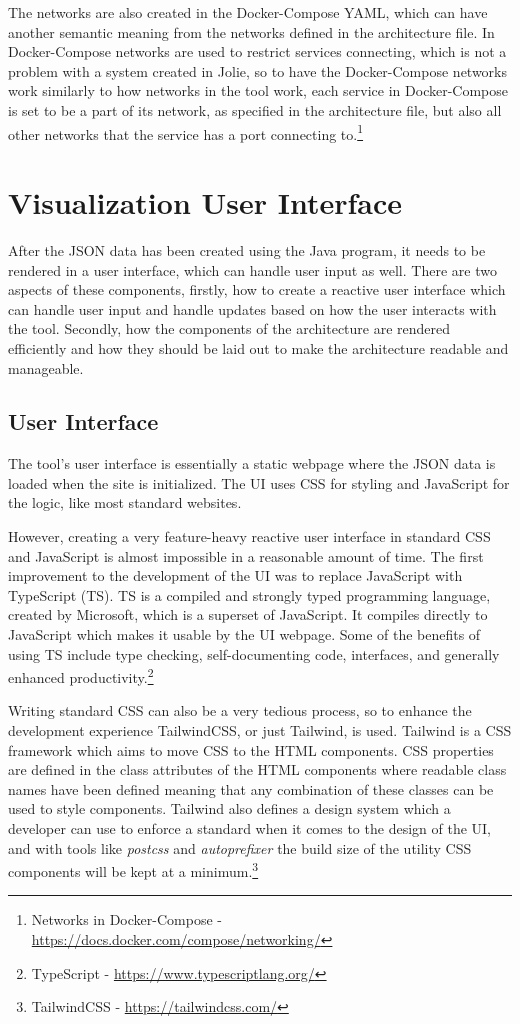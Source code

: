 The networks are also created in the Docker-Compose YAML, which can have another semantic meaning from the networks defined in the architecture file.
In Docker-Compose networks are used to restrict services connecting, which is not a problem with a system created in Jolie, so to have the Docker-Compose networks work similarly to how networks in the tool work, each service in Docker-Compose is set to be a part of
its network, as specified in the architecture file, but also all other networks that the service has a port connecting to.\footnote{Networks in Docker-Compose - \url{https://docs.docker.com/compose/networking/}}

\section{Visualization User Interface}
After the JSON data has been created using the Java program, it needs to be rendered in a user interface, which can handle user input as well.
There are two aspects of these components, firstly, how to create a reactive user interface which can handle user input and handle updates based on how the user interacts with the tool. Secondly, how the components of the architecture are rendered efficiently and how they should be laid out to make the architecture readable and manageable.

\subsection{User Interface}
The tool's user interface is essentially a static webpage where the JSON data is loaded when the site is initialized.
The UI uses CSS for styling and JavaScript for the logic, like most standard websites.

However, creating a very feature-heavy reactive user interface in standard CSS and JavaScript is almost impossible in a reasonable amount of time.
The first improvement to the development of the UI was to replace JavaScript with TypeScript (TS).
TS is a compiled and strongly typed programming language, created by Microsoft, which is a superset of JavaScript. It compiles directly to JavaScript which makes it usable by the UI webpage.
Some of the benefits of using TS include type checking, self-documenting code, interfaces, and generally enhanced productivity.\footnote{TypeScript - \url{https://www.typescriptlang.org/}}

Writing standard CSS can also be a very tedious process, so to enhance the development experience TailwindCSS, or just Tailwind, is used.
Tailwind is a CSS framework which aims to move CSS to the HTML components. CSS properties are defined in the class attributes of the HTML components where readable class names have been defined meaning that any combination of these classes can be used to style components.
Tailwind also defines a design system which a developer can use to enforce a standard when it comes to the design of the UI, and with tools like \textit{postcss} and \textit{autoprefixer} the build size of the utility CSS components will be kept at a minimum.\footnote{TailwindCSS - \url{https://tailwindcss.com/}}

